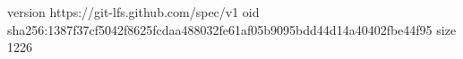 version https://git-lfs.github.com/spec/v1
oid sha256:1387f37cf5042f8625fcdaa488032fe61af05b9095bdd44d14a40402fbe44f95
size 1226
